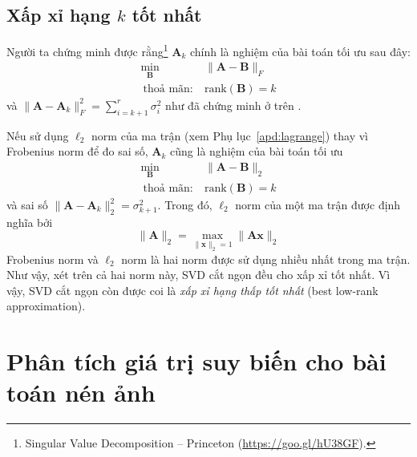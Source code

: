  
\subsection{Xấp xỉ hạng $k$ tốt nhất}
 
Người ta chứng minh được rằng\footnote{Singular Value Decomposition  -- 
Princeton (\url{https://goo.gl/hU38GF}).}
$\mathbf{A}_k$ chính là nghiệm của bài toán tối ưu sau đây:
\begin{equation} 
\label{eqn:26_17}
\begin{aligned}
\min_{\mathbf{B}} &\|\mathbf{A} - \mathbf{B}\|_F \\\ 
\text{thoả mãn:}~ & \text{rank}(\mathbf{B}) = k 
\end{aligned}
\end{equation} 
 và $\|\mathbf{A} - \mathbf{A}_k\|_F^2 = \sum_{i = k + 1}^r \sigma_i^2$ như đã chứng minh ở trên . 
 
Nếu sử dụng $\ell_2$ norm của ma trận (xem Phụ lục~\ref{apd:lagrange}) thay vì
Frobenius norm để đo
sai số,
$\mathbf{A}_k$ cũng là nghiệm của bài toán tối ưu
\begin{equation} 
    \begin{aligned}
    \min_{\mathbf{B}} &\|\mathbf{A} - \mathbf{B}\|_2 \\\ 
    \text{thoả mãn:}~ & \text{rank}(\mathbf{B}) = k 
    \end{aligned}
\end{equation} 
và sai số $\|\mathbf{A} - \mathbf{A}_k\|_2^2 = \sigma_{k+1}^2$. Trong đó, $\ell_2$ norm
của một ma trận được định nghĩa bởi
\begin{equation} 
\|\mathbf{A}\|_2 = \max_{\|\mathbf{x}\|_2 = 1} \|\mathbf{Ax}\|_2 
\end{equation} 
Frobenius norm và $\ell_2$ norm là hai norm được sử dụng nhiều nhất trong ma
trận. Như vậy, xét trên cả hai norm này, SVD cắt ngọn đều cho xấp xỉ tốt nhất.
Vì vậy, SVD cắt ngọn còn được coi là \textit{xấp xỉ hạng thấp tốt nhất} ({best low-rank approximation}).
 
 
 
\section{Phân tích giá trị suy biến cho bài toán nén ảnh}
 

